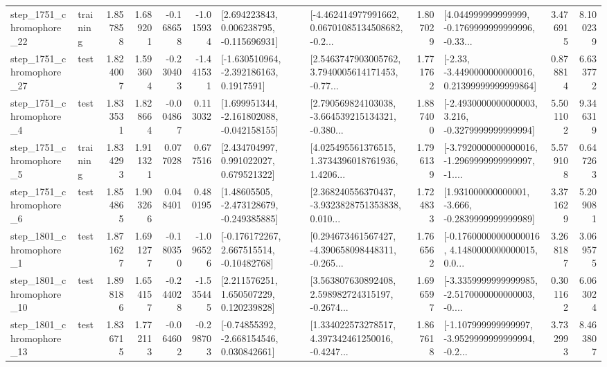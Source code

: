 \begin{tabular}{llrrrrllrlrr}
 step\_1751\_chromophore\_22 &  training &      1.857858 &    1.689201 &     -0.168658 & -1.015934 &    [2.694223843, 0.006238795, -0.115696931] &  [-4.462414977991662, 0.06701085134508682, -0.2... &       1.807029 &  [4.044999999999999, -0.1769999999999996, -0.33... &            3.476915 &          8.100239 \\
 step\_1751\_chromophore\_27 &      test &      1.824007 &    1.593604 &     -0.230403 & -1.441531 &     [-1.630510964, -2.392186163, 0.1917591] &  [2.5463747903005762, 3.7940005614171453, -0.77... &       1.771762 &  [-2.33, -3.4490000000000016, 0.21399999999999864] &            0.878814 &          6.633772 \\
  step\_1751\_chromophore\_4 &      test &      1.833531 &    1.828664 &     -0.004867 &  0.113032 &   [1.699951344, -2.161802088, -0.042158155] &  [2.790569824103038, -3.664539215134321, -0.380... &       1.887400 &  [-2.4930000000000003, 3.216, -0.3279999999999994] &            5.501102 &          9.346319 \\
  step\_1751\_chromophore\_5 &  training &      1.834293 &    1.911321 &      0.077028 &  0.677516 &     [2.434704997, 0.991022027, 0.679521322] &  [4.025495561376515, 1.3734396018761936, 1.4206... &       1.796139 &  [-3.7920000000000016, -1.2969999999999997, -1.... &            5.579108 &          0.647263 \\
  step\_1751\_chromophore\_6 &      test &      1.854865 &    1.903266 &      0.048401 &  0.480195 &    [1.48605505, -2.473128679, -0.249385885] &  [2.368240556370437, -3.9323828751353838, 0.010... &       1.724833 &   [1.931000000000001, -3.666, -0.2839999999999989] &            3.371629 &          5.209081 \\
  step\_1801\_chromophore\_1 &      test &      1.871627 &    1.691277 &     -0.180350 & -1.096526 &    [-0.176172267, 2.667515514, -0.10482768] &  [0.294673461567427, -4.390658098448311, -0.265... &       1.766562 &  [-0.17600000000000016, 4.1480000000000015, 0.0... &            3.268187 &          3.069575 \\
 step\_1801\_chromophore\_10 &      test &      1.898186 &    1.654157 &     -0.244028 & -1.535445 &     [2.211576251, 1.650507229, 0.120239828] &  [3.563807630892408, 2.598982724315197, -0.2674... &       1.696597 &  [-3.3359999999999985, -2.5170000000000003, -0.... &            0.301162 &          6.063024 \\
 step\_1801\_chromophore\_13 &      test &      1.836715 &    1.772113 &     -0.064602 & -0.298703 &    [-0.74855392, -2.668154546, 0.030842661] &  [1.334022573278517, 4.397342461250016, -0.4247... &       1.867618 &  [-1.107999999999997, -3.9529999999999994, -0.2... &            3.732993 &          8.463807 \\

\end{tabular}

